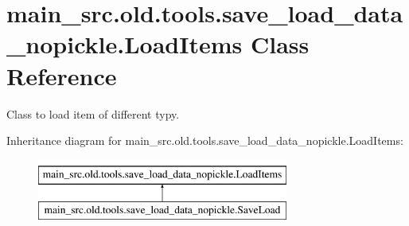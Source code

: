 \hypertarget{classmain__src_8old_1_1tools_1_1save__load__data__nopickle_1_1LoadItems}{\section{main\-\_\-src.\-old.\-tools.\-save\-\_\-load\-\_\-data\-\_\-nopickle.\-Load\-Items Class Reference}
\label{classmain__src_8old_1_1tools_1_1save__load__data__nopickle_1_1LoadItems}
}


Class to load item of different typy.  


Inheritance diagram for main\-\_\-src.\-old.\-tools.\-save\-\_\-load\-\_\-data\-\_\-nopickle.\-Load\-Items\-:\begin{figure}[H]
\begin{center}
\leavevmode
\includegraphics[height=2.000000cm]{classmain__src_8old_1_1tools_1_1save__load__data__nopickle_1_1LoadItems}
\end{center}
\end{figure}
